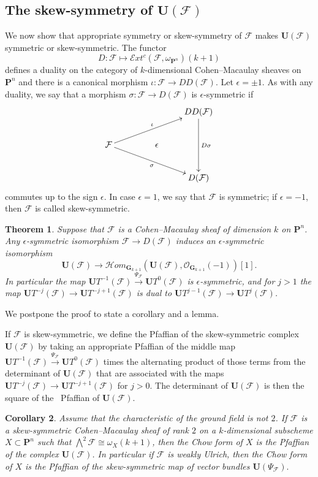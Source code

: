 \documentclass{jams-l}
\newtheorem{theorem}{Theorem}[section]
\newtheorem{corollary}[theorem]{Corollary}
\theoremstyle{definition}
\theoremstyle{remark}
\newcommand{\E} {{\mathcal E}}
\newcommand{\F}{{\mathcal F}}
\newcommand{\GG}{{\mathbf G}}
\newcommand{\cH}{{\mathcal H}}
\newcommand{\Ocal}{{\mathcal O}}
\newcommand{\PP}{{\mathbf P}}
\newcommand{\UU}{{\mathbf U}}
\newcommand{\iso}{\cong}
\newcommand{\rTo}{\xrightarrow}
\newcommand{\rTox}{\rightarrow}
\begin{document}
\subsection{The skew-symmetry of ${\mathbf U}({\mathcal F})$}

We now show that appropriate symmetry or skew-symmetry of $\F$
makes $\UU(\F)$ symmetric or skew-symmetric.
The functor
\[
D: \F \mapsto \E xt^c(\F,\omega_{\PP^n})(k+1)
\] 
defines a duality on the category of $k$-dimensional Cohen--Macaulay sheaves
on $\PP^n$ and there is 
a canonical morphism $\iota: \F\to DD(\F)$.
Let $\epsilon=\pm 1$. 
As with any duality, we
say that a morphism   
$\sigma: \F \rTox D(\F)$ is
$\epsilon$-symmetric if 
\begin{equation*}
\xymatrix{
&&DD(\F)\ar[dd]^{D\sigma}\\
\F\ar[urr]^{\iota}\ar[drr]_{\sigma}&{\qquad\epsilon}&\\
&&D(\F)
}
\end{equation*}
commutes up to the sign $\epsilon.$ 
In case $\epsilon=1$, we say that $\F$ is symmetric;
if $\epsilon=-1$, then $\F$ is called skew-symmetric.

\begin{theorem}\label{symmetry}
Suppose that $\F$ is a
Cohen--Macaulay sheaf of dimension $k$
on $\PP^n$. Any
$\epsilon$-symmetric isomorphism $\F\to D(\F)$
induces an $\epsilon$-symmetric isomorphism
\[
\UU(\F)\to \cH om_{\GG_{k+1}}(\UU(\F), \Ocal_{\GG_{k+1}}(-1))[1].
\] 
In particular the map
$\UU T^{-1}(\F) \rTo{\Psi_\F} \UU T^0(\F)$
is $\epsilon$-symmetric, and for $j>1$ the map
$\UU T^{-j}(\F) \rTox \UU T^{-j+1}(\F)$
is dual to 
$\UU T^{j-1}(\F) \rTox \UU T^{j}(\F)$.
\end{theorem}

We postpone the proof to state a corollary and a lemma.

If $\F$ is skew-symmetric, we define the 
Pfaffian of the skew-symmetric complex $\UU(\F)$ 
by taking an appropriate Pfaffian of the middle map 
$\UU T^{-1}(\F) \rTo{\Psi_\F} \UU T^{0}(\F)$
times the alternating product of those terms from the 
determinant of $\UU(\F)$ that are associated with the maps
$\UU T^{-j}(\F) \rTox \UU T^{-j+1}(\F)$
for $j>0$. The determinant of $\UU(\F)$ is then 
the square of the \pagebreak\ Pfaffian of $\UU(\F)$. 

\begin{corollary}\label{det as pfaff} Assume that the
characteristic of the ground field is not $2$.
If $\F$ is a skew-symmetric
Cohen--Macaulay sheaf of rank $2$
on a $k$-dimensional subscheme $X\subset \PP^n$
such that $\bigwedge^2\F \iso \omega_X(k+1)$, then the
Chow form of $X$ is the Pfaffian of the complex $\UU(\F)$.
In particular
if $\F$ is weakly Ulrich, then
the Chow form of $X$ is the Pfaffian of the skew-symmetric
map of vector bundles $\UU(\Psi_\F).$
\end{corollary}
\end{document}
